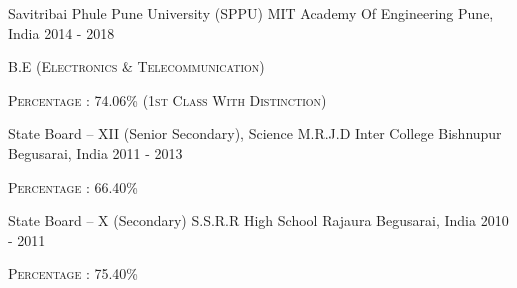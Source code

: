 \begin{cventries}
  \cventry
    {Savitribai Phule Pune University (SPPU)}
    {MIT Academy Of Engineering}
    {Pune, India}
    {2014 - 2018}
    {
      \begin{cvitems}
        \item{\textsc{B.E (Electronics \& Telecommunication)}}
        \item{\textsc{Percentage : 74.06\% (1st Class With Distinction)}}
      \end{cvitems}
    }
\end{cventries}

\vspace{-10pt}

\begin{cventries}
    \cventry
    {State Board – XII (Senior Secondary), Science}
    {M.R.J.D Inter College Bishnupur}
    {Begusarai, India}
    {2011 - 2013}
    {
      \begin{cvitems}
         \item{\textsc{Percentage : 66.40\%}}
      \end{cvitems}
    }  
\end{cventries}    

\vspace{-10pt}

\begin{cventries}
    \cventry
    {State Board – X (Secondary)}
    {S.S.R.R High School Rajaura}
    {Begusarai, India}
    {2010 - 2011}
    {
      \begin{cvitems}
         \item{\textsc{Percentage : 75.40\%}}
      \end{cvitems}
    }
\end{cventries}
    